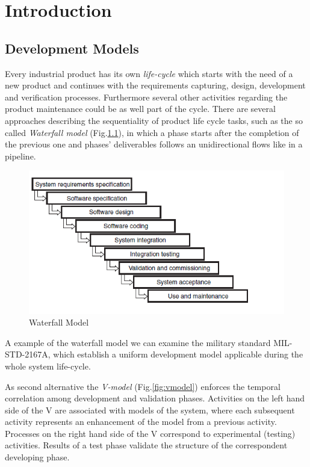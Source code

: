 
\chapter{Introduction}




\section{Development Models}
\label{sec:devmodels}


Every industrial product has its own \textit{life-cycle} which starts with the need of a new product and continues with the requirements capturing, design, development and verification processes. Furthermore several other activities regarding the product maintenance could be as well part of the cycle. There are several approaches describing the sequentiality of product life cycle tasks, such as the so called \textit{Waterfall model} (Fig.\ref{fig:waterfall}), in which a phase starts after the completion of the previous one and phases' deliverables follows an unidirectional flows like in a pipeline.
\begin{figure}[!h]
	\centering 
     \includegraphics[width=.75\textwidth]{Figs/waterfall.png} 
     \caption{Waterfall Model} 
     \label{fig:waterfall} 
\end{figure} 

A example of the waterfall model we can examine the military standard MIL-STD-2167A, which establish a uniform development model applicable during the whole system life-cycle.
\par As second alternative  the \textit{V-model} (Fig.\ref{fig:vmodel}) enforces the temporal correlation among development and validation phases. Activities on the left hand side of the V are associated with models of the system, where each subsequent activity represents an enhancement of the model from a previous activity. Processes on the right hand side of the V correspond to experimental (testing) activities. Results of a test phase validate the structure of the correspondent developing phase.

